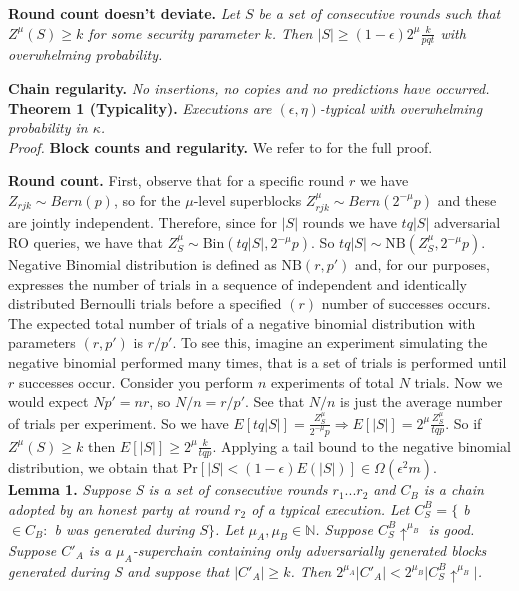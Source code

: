 \documentclass[11pt,a4paper]{article}
\begin{document}
\textbf{Round count doesn't deviate.} \textit{Let $S$ be a set of consecutive rounds such that $Z^\mu(S) \geq k$ for some security parameter $k$. Then $\vert S \vert \geq (1-\epsilon)2^\mu \frac{k}{pqt}$ with overwhelming probability.}

\textbf{Chain regularity.} \textit{No insertions, no copies and no predictions \cite{Backbone} have occurred.}\\

\textbf{Theorem 1 (Typicality).} \textit{Executions are $(\epsilon, \eta)$-typical  with overwhelming probability in $\kappa$.}\\

\textit{Proof.} \textbf{Block counts and regularity.} We refer to \cite{Backbone} for the full proof.

\textbf{Round count.} First, observe that for a specific round $r$ we have $Z_{rjk} \sim Bern(p)$, so for the $\mu$-level superblocks $Z_{rjk}^\mu \sim Bern(2^{-\mu}p)$ and these are jointly independent. Therefore, since for $\vert S \vert$ rounds we have $tq\vert S \vert$ adversarial RO queries, we have that $Z_S^\mu \sim \text{Bin}(tq \vert S \vert, 2^{-\mu}p)$. So $tq \vert S \vert \sim \text{NB}(Z_S^\mu, 2^{-\mu}p)$. Negative Binomial distribution is defined as $\text{NB}(r, p')$ and, for our purposes, expresses the number of trials in a sequence of independent and identically distributed Bernoulli trials before a specified $(r)$ number of successes occurs. The expected total number of trials of a negative binomial distribution with parameters $(r, p')$ is $r/p'$. To see this, imagine an experiment simulating the negative binomial performed many times, that is a set of trials is performed until $r$ successes occur. Consider you perform $n$ experiments of total $N$ trials. Now we would expect $Np' = nr$, so $N/n = r/p'$. See that $N/n$ is just the average number of trials per experiment. So we have $E[tq \vert S \vert] = \frac{Z^\mu_S}{2^{-\mu}p} \Rightarrow E[\vert S \vert] = 2^\mu \frac{Z^\mu_S}{tqp}$. So if $Z^\mu(S) \geq k$ then $E[\vert S \vert] \geq 2^\mu \frac{k}{tqp}$. Applying a tail bound to the negative binomial distribution, we obtain that $\text{Pr}[\vert S \vert < (1 - \epsilon)E(\vert S \vert)] \in \Omega(\epsilon^{2}m)$.  \\

\textbf{Lemma 1.} \textit{Suppose S is a set of consecutive rounds $r_1 ... r_2$ and $C_B$ is a chain adopted by an honest party at round $r_2$ of a typical execution. Let $C^{B}_{S} = \{$ b $\in C_B:$ b was generated during $S\}$. Let $\mu_A, \mu_B \in \mathbb{N}$. Suppose $C^{B}_{S}\uparrow^{\mu_B}$ is good. Suppose $C'_A$ is a $\mu_A$-superchain containing only adversarially generated blocks generated during S and suppose that $\vert C'_A \vert \geq k$. Then $2^{\mu_A} \vert C'_A \vert <  2^{\mu_B} \vert    C^{B}_{S}\uparrow^{\mu_B}\vert $. }\\
\end{document}
